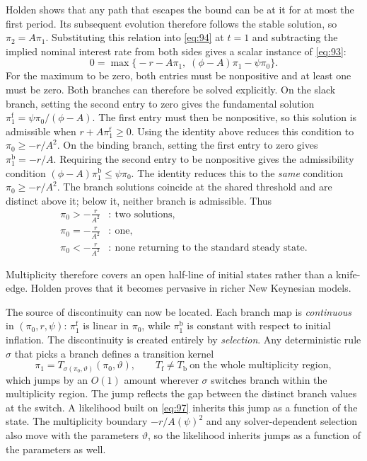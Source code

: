 \documentclass[11pt]{article}
\begin{document}
Holden shows that any path that escapes the bound can be at it for at most the first period. Its subsequent evolution therefore follows the stable solution, so $\pi_2=A\pi_1$. Substituting this relation into \eqref{eq:94} at $t=1$ and subtracting the implied nominal interest rate from both sides gives a scalar instance of \eqref{eq:93}:
\begin{equation}\label{eq:95}
 0=\max\bigl\{-r-A\pi_1,\;(\phi-A)\pi_1-\psi\pi_0\bigr\}.
\end{equation}
For the maximum to be zero, both entries must be nonpositive and at least one must be zero. Both branches can therefore be solved explicitly. On the slack branch, setting the second entry to zero gives the fundamental solution $\pi_1^{\mathrm f}=\psi\pi_0/(\phi-A)$. The first entry must then be nonpositive, so this solution is admissible when $r+A\pi_1^{\mathrm f}\geq0$. Using the identity above reduces this condition to $\pi_0\geq-r/A^{2}$. On the binding branch, setting the first entry to zero gives $\pi_1^{\mathrm b}=-r/A$. Requiring the second entry to be nonpositive gives the admissibility condition $(\phi-A)\pi_1^{\mathrm b}\leq\psi\pi_0$. The identity reduces this to the \emph{same} condition $\pi_0\geq-r/A^{2}$. The branch solutions coincide at the shared threshold and are distinct above it; below it, neither branch is admissible. Thus
\begin{equation}\label{eq:96}
\begin{aligned}
 \pi_0>-\frac{r}{A^{2}}&:\ \text{two solutions},\\
 \pi_0=-\frac{r}{A^{2}}&:\ \text{one},\\
 \pi_0<-\frac{r}{A^{2}}&:\ \text{none returning to the standard steady state}.
\end{aligned}
\end{equation}

Multiplicity therefore covers an open half-line of initial states rather than a knife-edge. Holden proves that it becomes pervasive in richer New Keynesian models.

The source of discontinuity can now be located. Each branch map is \emph{continuous} in $(\pi_0,r,\psi)$: $\pi_1^{\mathrm f}$ is linear in $\pi_0$, while $\pi_1^{\mathrm b}$ is constant with respect to initial inflation. The discontinuity is created entirely by \emph{selection}. Any deterministic rule $\sigma$ that picks a branch defines a transition kernel
\begin{equation}\label{eq:97}
 \pi_1=T_{\sigma(\pi_0,\vartheta)}(\pi_0,\vartheta),
 \qquad
 T_{\mathrm f}\neq T_{\mathrm b}\ \text{on the whole multiplicity region},
\end{equation}
which jumps by an $O(1)$ amount wherever $\sigma$ switches branch within the multiplicity region. The jump reflects the gap between the distinct branch values at the switch. A likelihood built on \eqref{eq:97} inherits this jump as a function of the state. The multiplicity boundary $-r/A(\psi)^{2}$ and any solver-dependent selection also move with the parameters $\vartheta$, so the likelihood inherits jumps as a function of the parameters as well.
\end{document}

